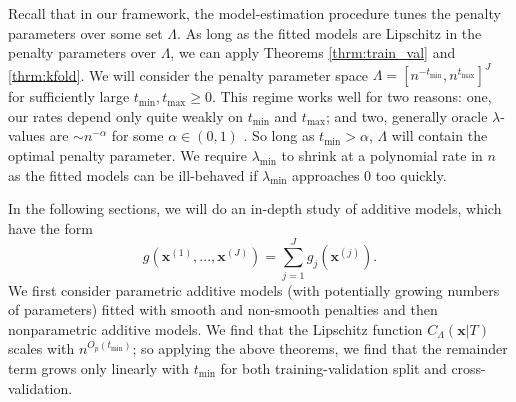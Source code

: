 \documentclass[12pt]{article} %
\theoremstyle{definition}
\begin{document}
Recall that in our framework, the model-estimation procedure tunes the penalty parameters over some set $\Lambda$. As long as the fitted models are Lipschitz in the penalty parameters over $\Lambda$, we can apply Theorems \ref{thrm:train_val} and \ref{thrm:kfold}.
We will consider the penalty parameter space
$\Lambda = [ n^{-t_{\min}}, n^{t_{\max}}]^J$
for sufficiently large $t_{\min}, t_{\max} \ge 0$.
This regime works well for two reasons: one, our rates depend only quite weakly on $t_{\min}$ and $t_{\max}$; and two, generally oracle $\lambda$-values are $\sim n^{-\alpha}$ for some $\alpha \in (0,1)$ \citep{van2000empirical, van2014additive, buhlmann2011statistics}. So long as $t_{\min} > \alpha$, $\Lambda$ will contain the optimal penalty parameter.
We require $\lambda_{\min}$ to shrink at a polynomial rate in $n$ as the fitted models can be ill-behaved if $\lambda_{\min}$ approaches 0 too quickly.




In the following sections, we will do an in-depth study of additive models, which have the form
\begin{equation}
g(\boldsymbol{x}^{(1)}, ..., \boldsymbol{x}^{(J)})= \sum_{j=1}^J g_j(\boldsymbol{x}^{(j)}).
\end{equation}
We first consider parametric additive models (with potentially growing numbers of parameters) fitted with smooth and non-smooth penalties and then nonparametric additive models.
We find that the Lipschitz function $C_\Lambda(\boldsymbol{x} | T)$ scales with $n^{O_p(t_{\min})}$; so applying the above theorems, we find that the remainder term grows only linearly with $t_{\min}$ for both training-validation split and cross-validation.
\end{document}
